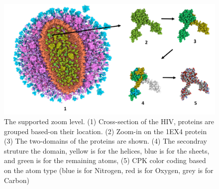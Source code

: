 \documentclass[review,journal]{vgtc}         %
\begin{document}
\begin{figure}
	\centering
	\includegraphics[width=1\linewidth]{Figures/Picture2_}
	\caption{The supported zoom level. (1) Cross-section of the HIV, proteins are grouped based-on their location. (2) Zoom-in on the 1EX4 protein (3) The two-domains of the proteins are shown. (4) The secondray struture the domain, yellow is for the helices, blue is for the sheets, and green is for the remaining atoms, (5) CPK color coding based on the atom type (blue is for Nitrogen, red is for Oxygen, grey is for Carbon)}
	\label{fig:Picture2}
\end{figure}

\end{document}

